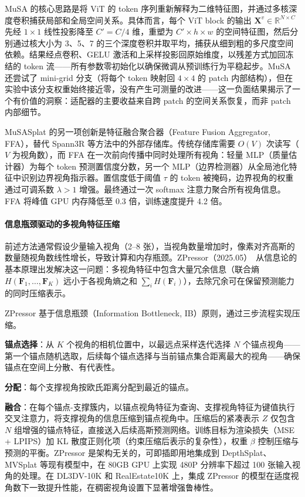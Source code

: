 MuSA 的核心思路是将 ViT 的 token 序列重新解释为二维特征图，并通过多核深度卷积捕获局部和全局空间关系。具体而言，每个 ViT block 的输出 $\mathbf{X}^v \in \mathbb{R}^{N \times C}$ 先经 $1 \times 1$ 线性投影降至 $C' = C/4$ 维，重塑为 $C' \times h \times w$ 的空间特征图，然后分别通过核大小为 3、5、7 的三个深度卷积并取平均，捕获从细到粗的多尺度空间依赖。结果经点卷积、GELU 激活和上采样投影回原始维度，以残差方式加回冻结的 token 流——所有参数零初始化以确保微调从预训练行为平稳起步。MuSA 还尝试了 mini-grid 分支（将每个 token 映射回 $4 \times 4$ 的 patch 内部结构），但在实验中该分支权重始终接近零，没有产生可测量的改进——这一负面结果揭示了一个有价值的洞察：适配器的主要收益来自跨 patch 的空间关系恢复，而非 patch 内部细节。

MuSASplat 的另一项创新是特征融合聚合器（Feature Fusion Aggregator, FFA），替代 Spann3R 等方法中的外部存储库。传统存储库需要 $O(V)$ 次读写（$V$ 为视角数），而 FFA 在一次前向传播中同时处理所有视角：轻量 MLP（质量估计器）为每个 token 预测置信度分数，另一个 MLP（边界检测器）从全局池化特征中识别边界视角指示器。置信度低于阈值 $\tau$ 的 token 被掩码，边界视角的权重通过可调系数 $\lambda > 1$ 增强。最终通过一次 softmax 注意力聚合所有视角信息。FFA 将峰值 GPU 内存降低至 0.3 倍，训练速度提升 4.2 倍。

\paragraph{信息瓶颈驱动的多视角特征压缩}

前述方法通常假设少量输入视角（2--8 张），当视角数量增加时，像素对齐高斯的数量随视角数线性增长，导致计算和内存瓶颈。ZPressor（2025.05）~\cite{2505_23734}从信息论的基本原理出发解决这一问题：多视角特征中包含大量冗余信息（联合熵 $H(\mathbf{F}_1, \ldots, \mathbf{F}_K)$ 远小于各视角熵之和 $\sum_i H(\mathbf{F}_i)$），去除冗余可在保留预测能力的同时压缩表示。

ZPressor 基于信息瓶颈（Information Bottleneck, IB）原则，通过三步流程实现压缩。

\textbf{锚点选择}：从 $K$ 个视角的相机位置中，以最远点采样迭代选择 $N$ 个锚点视角——第一个锚点随机选取，后续每个锚点选择与当前锚点集合距离最大的视角——确保锚点在空间上分散、有代表性。

\textbf{分配}：每个支撑视角按欧氏距离分配到最近的锚点。

\textbf{融合}：在每个锚点-支撑簇内，以锚点视角特征为查询、支撑视角特征为键值执行交叉注意力，将支撑视角的信息压缩到锚点视角中。压缩后的紧凑表示 $Z$ 仅包含 $N$ 组增强的锚点特征，直接送入后续高斯预测网络。训练目标为渲染损失（MSE + LPIPS）加 KL 散度正则化项（约束压缩后表示的复杂性），权重 $\beta$ 控制压缩与预测的平衡。ZPressor 是架构无关的，可即插即用地集成到 DepthSplat、MVSplat 等现有模型中，在 80GB GPU 上实现 480P 分辨率下超过 100 张输入视角的处理。在 DL3DV-10K 和 RealEstate10K 上，集成 ZPressor 的模型在适度视角数下一致提升性能，在稠密视角设置下显著增强鲁棒性。

